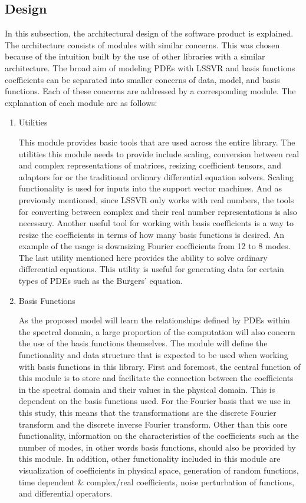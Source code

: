 \subsection{Design}\label{sec:implementation_design}
\noindent In this subsection, the architectural design of the software product is explained. The architecture consists of modules with similar concerns. This was chosen because of the intuition built by the use of other libraries with a similar architecture. The broad aim of modeling PDEs with LSSVR and basis functions coefficients can be separated into smaller concerns of data, model, and basis functions. Each of these concerns are addressed by a corresponding module. The explanation of each module are as follows:
\begin{enumerate}
  \item Utilities

        \noindent This module provides basic tools that are used across the entire library. The utilities this module needs to provide include scaling, conversion between real and complex representations of matrices, resizing coefficient tensors, and adaptors for or the traditional ordinary differential equation solvers. Scaling functionality is used for inputs into the support vector machines. And as previously mentioned, since LSSVR only works with real numbers, the tools for converting between complex and their real number representations is also necessary. Another useful tool for working with basis coefficients is a way to resize the coefficients in terms of how many basis functions is desired. An example of the usage is downsizing Fourier coefficients from 12 to 8 modes. The last utility mentioned here provides the ability to solve ordinary differential equations. This utility is useful for generating data for certain types of PDEs such as the Burgers' equation.

  \item Basis Functions

        \noindent As the proposed model will learn the relationships defined by PDEs within the spectral domain, a large proportion of the computation will also concern the use of the basis functions themselves. The module will define the functionality and data structure that is expected to be used when working with basis functions in this library. First and foremost, the central function of this module is to store and facilitate the connection between the coefficients in the spectral domain and their values in the physical domain. This is dependent on the basis functions used. For the Fourier basis that we use in this study, this means that the transformations are the discrete Fourier transform and the discrete inverse Fourier transform. Other than this core functionality, information on the characteristics of the coefficients such as the number of modes, in other words basis functions, should also be provided by this module. In addition, other functionality included in this module are visualization of coefficients in physical space, generation of random functions, time dependent \& complex/real coefficients, noise perturbation of functions, and differential operators.


\end{enumerate}
